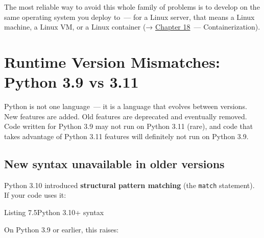 The most reliable way to avoid this whole family of problems is to develop on the same operating system you deploy to~--- for a Linux server, that means a Linux machine, a Linux VM, or a Linux container (→ \hyperref[ch:18-containerization]{Chapter 18}~--- Containerization).

\setcounter{section}{2}
\section{Runtime Version Mismatches: Python 3.9 vs 3.11}\label{07-environment-drift:73-runtime-version-mismatches-python-39-vs-311}

Python is not one language~--- it is a language that evolves between versions. New features are added. Old features are deprecated and eventually removed. Code written for Python 3.9 may not run on Python 3.11 (rare), and code that takes advantage of Python 3.11 features will definitely not run on Python 3.9.

\subsection*{New syntax unavailable in older versions}\label{07-environment-drift:new-syntax-unavailable-in-older-versions}

Python 3.10 introduced \textbf{structural pattern matching} (the \texttt{match} statement). If your code uses it:

\begin{codeboxcap}[short]{\textcolor{accent}{Listing 7.5}\enspace Python 3.10+ syntax}

\begin{Shaded}
\begin{Highlighting}[]
    \NormalTok{ event[}\NormalTok{]:}
         \NormalTok{:}
         \NormalTok{:}
        \NormalTok{ \_:}
\end{Highlighting}
\end{Shaded}

\end{codeboxcap}

\noindent{}On Python 3.9 or earlier, this raises:

